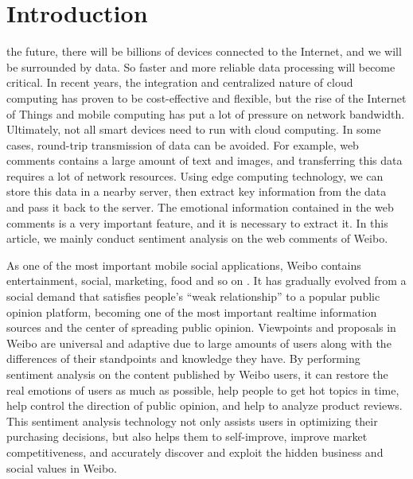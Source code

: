 \documentclass{ieeeaccess}
\begin{document}
\titlepgskip=-15pt

\maketitle

\section{Introduction}
\label{sec:introduction}
 the future, there will be billions of devices connected to the Internet, and we will be surrounded by data. So faster and more reliable data processing will become critical. In recent years, the integration and centralized nature of cloud computing has proven to be cost-effective and flexible, but the rise of the Internet of Things and mobile computing has put a lot of pressure on network bandwidth. Ultimately, not all smart devices need to run with cloud computing. In some cases, round-trip transmission of data can be avoided. For example, web comments contains a large amount of text and images, and transferring this data requires a lot of network resources. Using edge computing technology, we can store this data in a nearby server, then extract key information from the data and pass it back to the server. The emotional information contained in the web comments is a very important feature, and it is necessary to extract it. In this article, we mainly conduct sentiment analysis on the web comments of Weibo.

As one of the most important mobile social applications, Weibo contains entertainment, social, marketing, food and so on \cite{DBLP:conf/IEEEcit/ChenLZW16}. It has gradually evolved from a social demand that satisfies people’s “we$  $ak relationship” to a popular public opinion platform, becoming one of the most important realtime information sources and the center of spreading public opinion. Viewpoints and proposals in Weibo are universal and adaptive due to large amounts of users along with the differences of their standpoints and knowledge they have. By performing sentiment analysis on the content published by Weibo users, it can restore the real emotions of users as much as possible, help people to get hot topics in time, help control the direction of public opinion, and help to analyze product reviews. This sentiment analysis technology not only assists users in optimizing their purchasing decisions, but also helps them to self-improve, improve market competitiveness, and accurately discover and exploit the hidden business and social values in Weibo.
\end{document}
